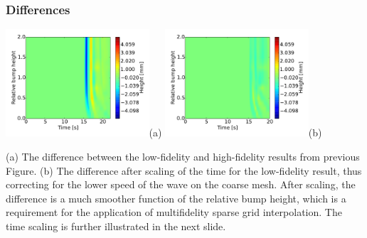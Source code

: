 \documentclass[11pt,ucs]{beamer}
\begin{document}
\begin{frame}\frametitle{Differences}

\begin{center}
\includegraphics[width=0.4\textwidth]{illustrate1d_difference1}\textsf{(a)}
\includegraphics[width=0.4\textwidth]{illustrate1d_difference2}\textsf{(b)}
\end{center}

\small{
(a) The difference between the low-fidelity and high-fidelity results from previous Figure. (b) The difference after scaling of the time for the low-fidelity result, thus correcting for the lower speed of the wave on the coarse mesh. After scaling, the difference is a much smoother function of the relative bump height, which is a requirement for the application of multifidelity sparse grid interpolation. The time scaling is further illustrated in the next slide.}


\end{frame}
\end{document}
